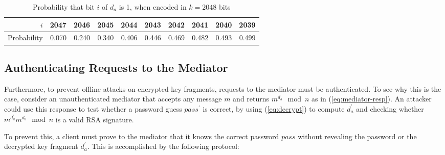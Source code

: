 \documentclass{llncs}
\begin{document}
\renewcommand{\arraystretch}{1.5}
\setlength\tabcolsep{4pt}
\begin{table}[t]
\centering
\caption{Probability that bit $i$ of $d_a$ is 1, when encoded in $k=2048$ bits}\label{tab:bias}
\begin{tabular}{r|rrrrrrrrr}
$i$ & 2047 & 2046 & 2045 & 2044 & 2043 & 2042 & 2041 & 2040 & 2039 \\ \hline
Probability &
0.070 & 0.240 & 0.340 & 0.406 & 0.446 & 0.469 & 0.482 & 0.493 & 0.499
\end{tabular}
\end{table}


\subsection{Authenticating Requests to the Mediator}\label{sec:mediator-auth}

Furthermore, to prevent offline attacks on encrypted key fragments, requests to the mediator must be
authenticated. To see why this is the case, consider an unauthenticated mediator that accepts any
message $m$ and returns $m^{d_b} \mod n$ as in (\ref{eq:mediator-resp}). An attacker could use this
response to test whether a password guess $\mathit{pass}^\prime$ is correct, by using
(\ref{eq:decrypt}) to compute $d_a^\prime$ and checking whether $m^{d_a^\prime} m^{d_b} \mod n$ is a
valid RSA signature.

To prevent this, a client must prove to the mediator that it knows the correct password
$\mathit{pass}$ without revealing the password or the decrypted key fragment $d_a^\prime$. This is
accomplished by the following protocol:
\end{document}

